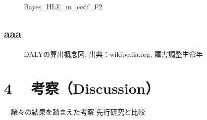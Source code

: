 \documentclass[a4j,11pt,mc, twocolumn]{jreport}
\begin{document}
	\begin{figure}[h!]
		\begin{center}
				\caption{Bayes\_HLE\_m\_ccdf\_F2}
		\end{center}
	\end{figure}



	\section{aaa}
	\begin{figure}[h!]
		\begin{center}
				\caption{DALYの算出概念図, 出典：wikipedia.org, 障害調整生命年
			}
		\end{center}
	\end{figure}






\chapter{4	　考察（Discussion）}
  　諸々の結果を踏まえた考察
先行研究と比較
\end{document}

